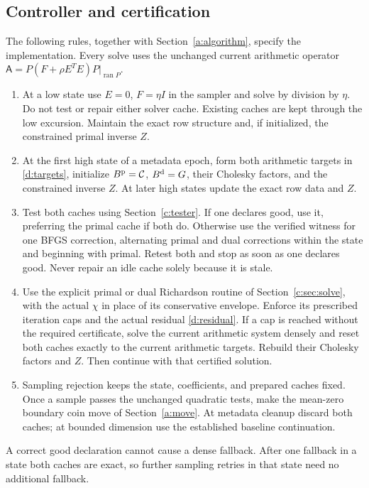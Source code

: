 \documentclass[11pt]{amsart}
\theoremstyle{definition}\newtheorem{definition}[theorem]{Definition}
\theoremstyle{remark}\newtheorem{remark}[theorem]{Remark}
\numberwithin{equation}{section}
\begin{document}
\subsection{Controller and certification}\label{d:controller}
The following rules, together with Section~\ref{a:algorithm}, specify the
implementation. Every solve uses the unchanged current arithmetic
operator $\mathsf A=P(F+\rho E^TE)P|_{\operatorname{ran}P}$.
\begin{enumerate}
\item At a low state use $E=0$, $F=\eta I$ in the sampler and solve by
division by $\eta$. Do not test or repair either solver cache. Existing
caches are kept through the low excursion. Maintain the exact row
structure and, if initialized, the constrained primal inverse $Z$.
\item At the first high state of a metadata epoch, form both arithmetic
targets in \eqref{d:targets}, initialize $B^{\rm p}=\mathcal C$,
$B^{\rm d}=G$, their Cholesky factors, and the constrained inverse $Z$.
At later high states update the exact row data and $Z$.
\item Test both caches using Section~\ref{c:tester}. If one declares good,
use it, preferring the primal cache if both do. Otherwise use the verified
witness for one BFGS correction, alternating primal and dual corrections
within the state and beginning with primal. Retest both and stop as soon
as one declares good. Never repair an idle cache solely because it is stale.
\item Use the explicit primal or dual Richardson routine of
Section~\ref{c:sec:solve}, with the actual $\chi$ in place of its
conservative envelope. Enforce its prescribed iteration caps and the
actual residual \eqref{d:residual}. If a cap is reached without the
required certificate, solve the current arithmetic system densely and
reset both caches exactly to the current arithmetic targets. Rebuild
their Cholesky factors and $Z$. Then continue with that certified solution.
\item Sampling rejection keeps the state, coefficients, and prepared
caches fixed. Once a sample passes the unchanged quadratic tests, make
the mean-zero boundary coin move of Section~\ref{a:move}. At metadata
cleanup discard both caches; at bounded dimension use the established
baseline continuation.
\end{enumerate}
A correct good declaration cannot cause a dense fallback. After one
fallback in a state both caches are exact, so further sampling retries
in that state need no additional fallback.
\end{document}
